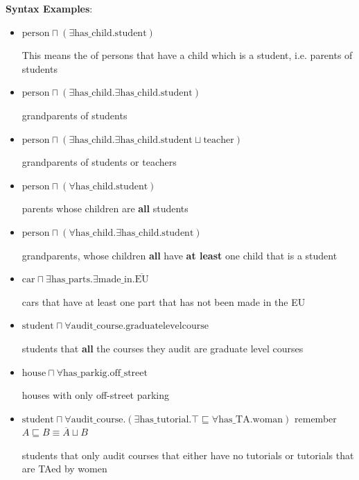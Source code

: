 
\textbf{Syntax Examples}:

\begin{itemize}
\item $\text{person} \sqcap (\exists \text{has\_child.student})$

This means the  of persons that have a child which is a student, i.e. parents of students

\item $\text{person} \sqcap (\exists \text{has\_child.}\exists \text{has\_child.student})$

grandparents of students

\item $\text{person} \sqcap (\exists \text{has\_child.}\exists \text{has\_child.student}\sqcup \text{teacher})$

grandparents of students or teachers

\item $\text{person} \sqcap (\forall \text{has\_child.student})$

parents whose children are \textbf{all} students 

\item $\text{person} \sqcap (\forall \text{has\_child}.\exists \text{has\_child.student})$

grandparents, whose children \textbf{all} have \textbf{at least} one child that is a student

\item $\text{car} \sqcap \exists \text{has\_parts}.\exists \text{made\_in}. \overline{\text{EU}}$

cars that have at least one part that has not been made in the EU 

\item $\text{student} \sqcap \forall \text{audit\_course.graduatelevelcourse}$

students that \textbf{all} the courses they audit are graduate level courses

\item $\text{house} \sqcap \forall \text{has\_parkig.off\_street}$

houses with only off-street parking

\item $\text{student} \sqcap \forall \text{audit\_course}.(\exists \text{has\_tutorial}.\top \sqsubseteq \forall \text{has\_TA.woman})$ \hfill remember $A \sqsubseteq B \equiv \overline{A} \sqcup B$

students that only audit courses that either have no tutorials or tutorials that are TAed by women
\end{itemize}


